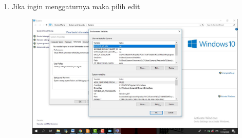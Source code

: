 \begin{enumerate}
\begin{enumerate}
\begin{enumerate}
\begin{enumerate}
\begin{figure}[h]
    \caption{}
    \label{fig:my_label}
\end{figure}
\item Jika ingin menggaturnya maka pilih edit
\begin{figure}[h]
    \centering
    \includegraphics[scale=0.2]{gambar/28.png}
    \caption{}
    \label{fig:my_label}
\end{figure}

\end{enumerate}
\end{enumerate}
\end{enumerate}
\end{enumerate}
